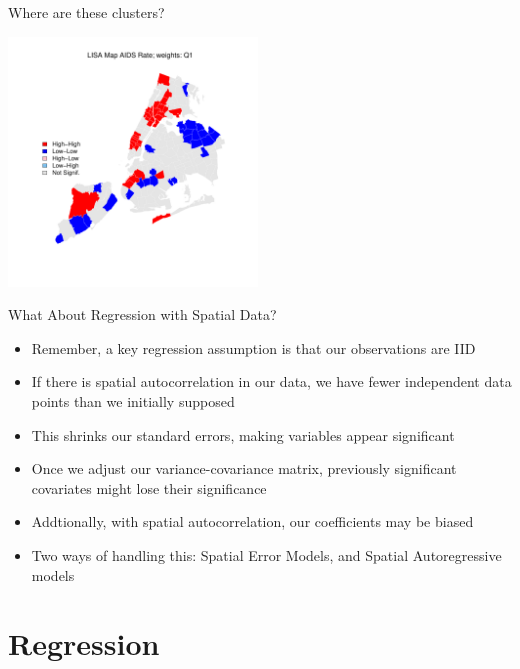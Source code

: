 \documentclass[aspectratio = 169, 12pt]{beamer}\usepackage[]{graphicx}\usepackage[]{color}
\makeatletter
\newenvironment{kframe}{%
 \def\at@end@of@kframe{}%
 \ifinner\ifhmode%
  \def\at@end@of@kframe{\end{minipage}}%
  \begin{minipage}{\columnwidth}%
 \fi\fi%
 \def\FrameCommand##1{\hskip\@totalleftmargin \hskip-\fboxsep
 \colorbox{shadecolor}{##1}\hskip-\fboxsep
     \hskip-\linewidth \hskip-\@totalleftmargin \hskip\columnwidth}%
 \MakeFramed {\advance\hsize-\width
   \@totalleftmargin\z@ \linewidth\hsize
   \@setminipage}}%
 {\par\unskip\endMakeFramed%
 \at@end@of@kframe}
\newenvironment{knitrout}{}{} %
\makeatother
\begin{document}
\begin{frame}[fragile]{Where are these clusters?}
\begin{knitrout}\tiny
{}\color{fgcolor}\begin{kframe}


{\ttfamily\noindent\bfseries\color{errorcolor}{\#\# Error in ogrInfo(dsn = dsn, layer = layer, encoding = encoding, use\_iconv = use\_iconv, : Cannot open data source}}\end{kframe}
\includegraphics[width=250px]{figure/unnamed-chunk-7-1} 

\end{knitrout}
\end{frame}

\begin{frame}{What About Regression with Spatial Data?}
\begin{itemize}
\item Remember, a key regression assumption is that our observations are IID
\item If there is spatial autocorrelation in our data, we have fewer independent data points than we initially supposed
\item This shrinks our standard errors, making variables appear significant
\item Once we adjust our variance-covariance matrix, previously significant covariates might lose their significance 
\item Addtionally, with spatial autocorrelation, our coefficients may be biased 
\item Two ways of handling this: Spatial Error Models, and Spatial Autoregressive models
\end{itemize}
\end{frame}

\section{Regression}
\end{document}

